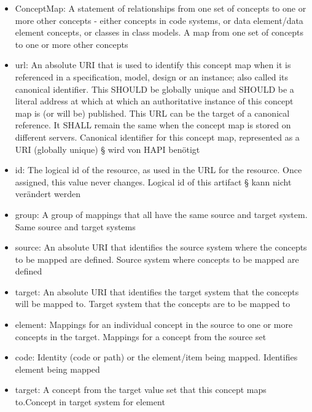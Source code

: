 \begin{itemize}
\item ConceptMap: A statement of relationships from one set of concepts to one or more other concepts - either concepts in code systems, or data element/data element concepts, or classes in class models. \newline A map from one set of concepts to one or more other concepts
\item url: An absolute URI that is used to identify this concept map when it is referenced in a specification, model, design or an instance; also called its canonical identifier. This SHOULD be globally unique and SHOULD be a literal address at which at which an authoritative instance of this concept map is (or will be) published. This URL can be the target of a canonical reference. It SHALL remain the same when the concept map is stored on different servers. \newline Canonical identifier for this concept map, represented as a URI (globally unique) \newline § wird von HAPI benötigt
\item id: The logical id of the resource, as used in the URL for the resource. Once assigned, this value never changes. \newline Logical id of this artifact § kann nicht verändert werden
\item group:  A group of mappings that all have the same source and target system. \newline Same source and target systems
\item source: An absolute URI that identifies the source system where the concepts to be mapped are defined. \newline 	Source system where concepts to be mapped are defined
\item target: An absolute URI that identifies the target system that the concepts will be mapped to. \newline Target system that the concepts are to be mapped to
\item element: Mappings for an individual concept in the source to one or more concepts in the target. \newline Mappings for a concept from the source set
\item code: Identity (code or path) or the element/item being mapped. \newline Identifies element being mapped
\item target: A concept from the target value set that this concept maps to.\newline Concept in target system for element

\end{itemize}
